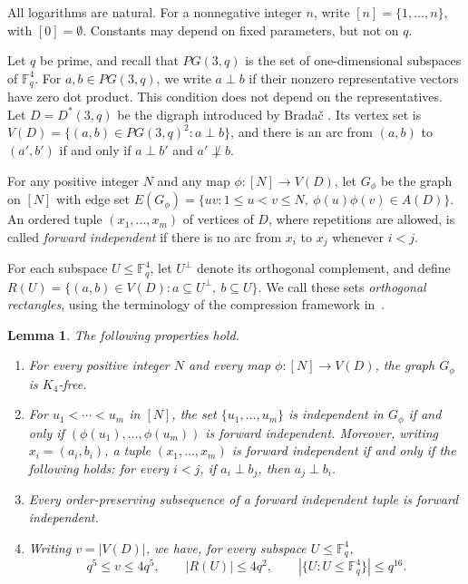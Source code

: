 \documentclass[11pt,a4paper]{article}
\numberwithin{equation}{section}
\newtheorem{lemma}[theorem]{Lemma}
\newcommand{\Fq}{\mathbb F_q}
\begin{document}
All logarithms are natural. For a nonnegative integer $n$, write
$[n]=\{1,\ldots,n\}$, with $[0]=\emptyset$.
Constants may depend on fixed parameters, but not on $q$.

Let $q$ be prime, and recall that $PG(3,q)$ is the set of
one-dimensional subspaces of $\Fq^4$. For $a,b\in PG(3,q)$,
we write $a\perp b$ if their nonzero representative vectors have
zero dot product. This condition does not depend on the representatives.
Let $D=D^*(3,q)$ be the digraph introduced by Brada\v{c}
\cite[Section~2.5]{Bradac}. Its vertex set is
$V(D)=\{(a,b)\in PG(3,q)^2:a\perp b\}$,
and there is an arc from $(a,b)$ to $(a',b')$ if and only if
$a\perp b'$ and $a'\not\perp b$.

For any positive integer $N$ and any map
$\phi:[N]\to V(D)$, let $G_\phi$ be the graph on $[N]$
with edge set
$E(G_\phi)=\{uv:1\le u<v\le N,\ \phi(u)\phi(v)\in A(D)\}$.
An ordered tuple $(x_1,\ldots,x_m)$ of vertices of $D$,
where repetitions are allowed, is called \emph{forward independent}
if there is no arc from $x_i$ to $x_j$ whenever $i<j$.

For each subspace $U\le\Fq^4$, let $U^\perp$ denote its
orthogonal complement, and define
$R(U)=\{(a,b)\in V(D):a\subseteq U^\perp,\ b\subseteq U\}$.
We call these sets \emph{orthogonal rectangles}, using the terminology
of the compression framework in~\cite{OAI}.

\begin{lemma}\label{lem:construction}
The following properties hold.
\begin{enumerate}
\item[(i)] For every positive integer $N$ and every map
$\phi:[N]\to V(D)$, the graph $G_\phi$ is $K_4$-free.

\item[(ii)] For $u_1<\cdots<u_m$ in $[N]$, the set
$\{u_1,\ldots,u_m\}$ is independent in $G_\phi$ if and only if
$(\phi(u_1),\ldots,\phi(u_m))$ is forward independent.
Moreover, writing $x_i=(a_i,b_i)$, a tuple
$(x_1,\ldots,x_m)$ is forward independent if and only if the
following holds: for every $i<j$, if $a_i\perp b_j$, then
$a_j\perp b_i$.

\item[(iii)] Every order-preserving subsequence of a forward
independent tuple is forward independent.

\item[(iv)] Writing $v=|V(D)|$, we have, for every subspace
$U\le\Fq^4$,
\begin{equation}\label{eq:geometry}
 q^5\le v\le4q^5,\qquad
 |R(U)|\le4q^2,\qquad
 |\{U:U\le\Fq^4\}|\le q^{16}.
\end{equation}
\end{enumerate}
\end{lemma}
\end{document}
